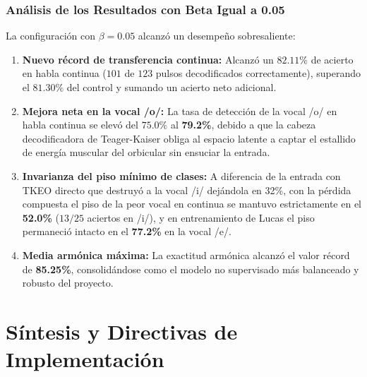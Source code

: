 \documentclass[11pt,a4paper,openany]{book}
\theoremstyle{definition}
\begin{document}
\subsubsection{Análisis de los Resultados con Beta Igual a 0.05}
\label{subsubsec:analisis_beta_005}

La configuración con $\beta = 0.05$ alcanzó un desempeño sobresaliente:
\begin{enumerate}
    \item \textbf{Nuevo récord de transferencia continua:} Alcanzó un $82.11\%$ de acierto en habla continua ($101$ de $123$ pulsos decodificados correctamente), superando el $81.30\%$ del control y sumando un acierto neto adicional.
    \item \textbf{Mejora neta en la vocal /o/:} La tasa de detección de la vocal /o/ en habla continua se elevó del $75.0\%$ al \textbf{79.2\%}, debido a que la cabeza decodificadora de Teager-Kaiser obliga al espacio latente a captar el estallido de energía muscular del orbicular sin ensuciar la entrada.
    \item \textbf{Invarianza del piso mínimo de clases:} A diferencia de la entrada con TKEO directo que destruyó a la vocal /i/ dejándola en 32\%, con la pérdida compuesta el piso de la peor vocal en continua se mantuvo estrictamente en el \textbf{52.0\%} ($13/25$ aciertos en /i/), y en entrenamiento de Lucas el piso permaneció intacto en el \textbf{77.2\%} en la vocal /e/.
    \item \textbf{Media armónica máxima:} La exactitud armónica alcanzó el valor récord de \textbf{85.25\%}, consolidándose como el modelo no supervisado más balanceado y robusto del proyecto.
\end{enumerate}

\section{Síntesis y Directivas de Implementación}
\label{sec:sintesis}
\end{document}
